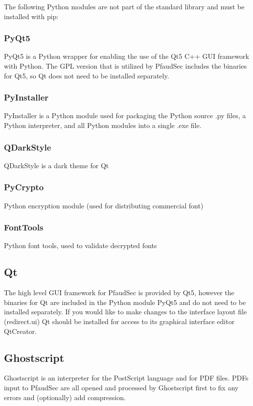 \documentclass[14pt]{article}
\begin{document}
\begin{flushleft}
The following Python modules are not part of the standard library and must be installed with pip:

		\begin{subs}
		\subsubsection{PyQt5}
PyQt5 is a Python wrapper for enabling the use of the Qt5 C++ GUI framework with Python.
The GPL version that is utilized by PfaudSec includes the binaries for Qt5, so Qt does not need to be installed separately.

		\subsubsection{PyInstaller}
PyInstaller is a Python module used for packaging the Python source .py files, a Python interpreter, and all Python modules into a single .exe file.

		\subsubsection{QDarkStyle}
QDarkStyle is a dark theme for Qt

		\subsubsection{PyCrypto}
Python encryption module (used for distributing commercial font)

		\subsubsection{FontTools}
Python font tools, used to validate decrypted fonts
		\end{subs}

	\subsection{Qt}
The high level GUI framework for PfaudSec is provided by Qt5, however the binaries for Qt are included in the Python module PyQt5 and do not need to be installed separately.
If you would like to make changes to the interface layout file (redirect.ui) Qt should be installed for access to its graphical interface editor QtCreator.

	\subsection{Ghostscript}
Ghostscript is an interpreter for the PostScript language and for PDF files.
PDFs input to PfaudSec are all opened and processed by Ghostscript first to fix any errors and (optionally) add compression.


\end{flushleft}
\end{document}
